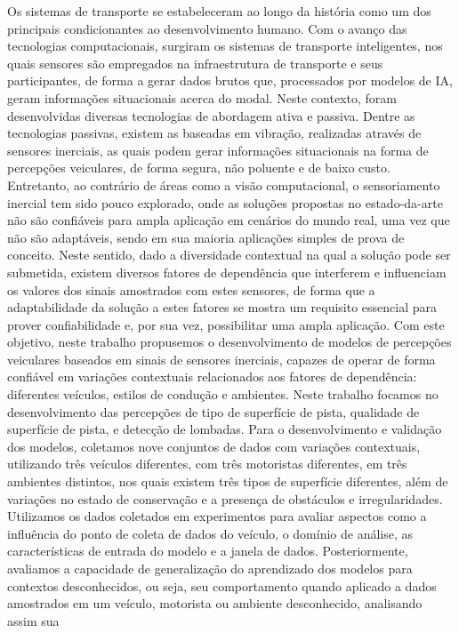 
\begin{resumo}[Resumo]
    Os sistemas de transporte se estabeleceram ao longo da história como um dos principais condicionantes ao desenvolvimento humano. Com o avanço das tecnologias computacionais, surgiram os sistemas de transporte inteligentes, nos quais sensores são empregados na infraestrutura de transporte e seus participantes, de forma a gerar dados brutos que, processados por modelos de IA, geram informações situacionais acerca do modal. Neste contexto, foram desenvolvidas diversas tecnologias de abordagem ativa e passiva. Dentre as tecnologias passivas, existem as baseadas em vibração, realizadas através de sensores inerciais, as quais podem gerar informações situacionais na forma de percepções veiculares, de forma segura, não poluente e de baixo custo. Entretanto, ao contrário de áreas como a visão computacional, o sensoriamento inercial tem sido pouco explorado, onde as soluções propostas no estado-da-arte não são confiáveis para ampla aplicação em cenários do mundo real, uma vez que não são adaptáveis, sendo em sua maioria aplicações simples de prova de conceito. Neste sentido, dado a diversidade contextual na qual a solução pode ser submetida, existem diversos fatores de dependência que interferem e influenciam os valores dos sinais amostrados com estes sensores, de forma que a adaptabilidade da solução a estes fatores se mostra um requisito essencial para prover confiabilidade e, por sua vez, possibilitar uma ampla aplicação. Com este objetivo, neste trabalho propusemos o desenvolvimento de modelos de percepções veiculares baseados em sinais de sensores inerciais, capazes de operar de forma confiável em variações contextuais relacionados aos fatores de dependência: diferentes veículos, estilos de condução e ambientes. Neste trabalho focamos no desenvolvimento das percepções de tipo de superfície de pista, qualidade de superfície de pista, e detecção de lombadas. Para o desenvolvimento e validação dos modelos, coletamos nove conjuntos de dados com variações contextuais, utilizando três veículos diferentes, com três motoristas diferentes, em três ambientes distintos, nos quais existem três tipos de superfície diferentes, além de variações no estado de conservação e a presença de obstáculos e irregularidades. Utilizamos os dados coletados em experimentos para avaliar aspectos como a influência do ponto de coleta de dados do veículo, o domínio de análise, as características de entrada do modelo e a janela de dados. Posteriormente, avaliamos a capacidade de generalização do aprendizado dos modelos para contextos desconhecidos, ou seja, seu comportamento quando aplicado a dados amostrados em um veículo, motorista ou ambiente desconhecido, analisando assim sua 
\end{resumo}
